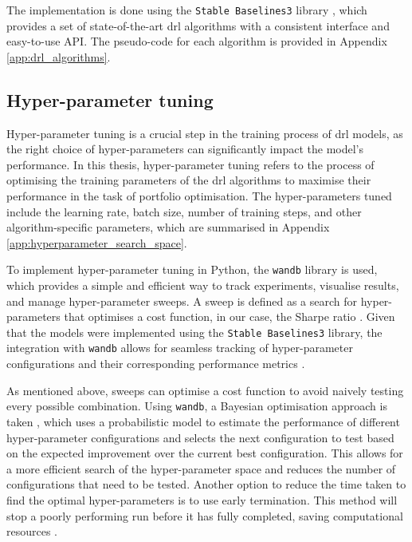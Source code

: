 The implementation is done using the \texttt{Stable Baselines3} library \cite{Raffin2021}, which provides a set of state-of-the-art \acrshort{drl} algorithms with a consistent interface and easy-to-use API. The pseudo-code for each algorithm is provided in Appendix \ref{app:drl_algorithms}.

\subsection{Hyper-parameter tuning} \label{subsec:hyperparameter-tuning}

Hyper-parameter tuning \cite{Kiran2022} is a crucial step in the training process of \acrshort{drl} models, as the right choice of hyper-parameters can significantly impact the model's performance. In this thesis, hyper-parameter tuning refers to the process of optimising the training parameters of the \acrshort{drl} algorithms to maximise their performance in the task of portfolio optimisation. The hyper-parameters tuned include the learning rate, batch size, number of training steps, and other algorithm-specific parameters, which are summarised in Appendix \ref{app:hyperparameter_search_space}. 

To implement hyper-parameter tuning in Python, the \texttt{wandb} \cite{wandb} library is used, which provides a simple and efficient way to track experiments, visualise results, and manage hyper-parameter sweeps. A sweep is defined as a search for hyper-parameters that optimises a cost function, in our case, the Sharpe ratio \cite{Sharpe1994}. Given that the models were implemented using the \texttt{Stable Baselines3} library, the integration with \texttt{wandb} allows for seamless tracking of hyper-parameter configurations and their corresponding performance metrics \cite{WeightsBiases2025}.

As mentioned above, sweeps can optimise a cost function to avoid naively testing every possible combination. Using \texttt{wandb}, a Bayesian optimisation approach is taken \cite{Falkner2018}, which uses a probabilistic model to estimate the performance of different hyper-parameter configurations and selects the next configuration to test based on the expected improvement over the current best configuration. This allows for a more efficient search of the hyper-parameter space and reduces the number of configurations that need to be tested. Another option to reduce the time taken to find the optimal hyper-parameters is to use early termination. This method will stop a poorly performing run before it has fully completed, saving computational resources \cite{WANDBSweep}.

